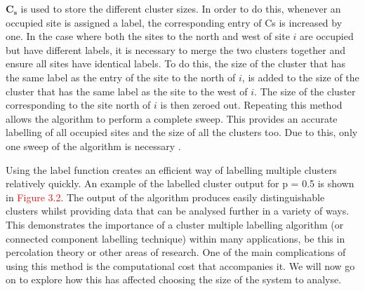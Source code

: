 $\mathbf{C_s}$ is used to store the different cluster sizes. In order to do this, whenever an occupied site is assigned a label, 
the corresponding entry of Cs is increased by one. In the case where both the sites to the north and west of site $i$ are occupied 
but have different labels, it is necessary to merge the two clusters together and ensure all sites have identical labels. 
To do this, the size of the cluster that has the same label as the entry of the site to the north of $i$, is
added to the size of the cluster that has the same label as the site to the west of $i$. The size of the cluster corresponding to the site
north of $i$ is then zeroed out. Repeating this method allows the algorithm to perform a complete sweep. 
This provides an accurate labelling of all occupied sites and the size of all the clusters too. Due to this, only one sweep of the
algorithm is necessary \cite{hoshen1976percolation}.

Using the label function creates an efficient way of labelling multiple clusters relatively quickly. 
An example of the labelled cluster output for p = 0.5 is shown in \textcolor{red}{Figure 3.2}. 
The output of the algorithm produces easily distinguishable clusters whilst providing data that can be analysed further in a variety of ways. 
This demonstrates the importance of a cluster multiple labelling algorithm (or connected component labelling technique) within many applications, 
be this in percolation theory or other areas of research. 
One of the main complications of using this method is the computational cost that accompanies it. 
We will now go on to explore how this has affected choosing the size of the system to analyse.




